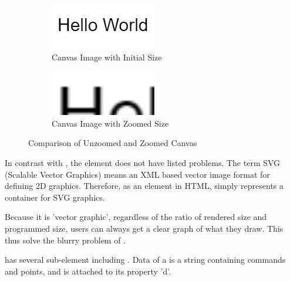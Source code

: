 \documentclass[12pt,twoside]{report}
\begin{document}
\begin{figure}[h!]
    \centering
    \begin{subfigure}[b]{0.4\linewidth}
        \centering
        \includegraphics[width=\linewidth, frame]{figures/unzoomed-canvas.png}
        \caption{Canvas Image with Initial Size}
    \end{subfigure}
    \begin{subfigure}[b]{0.4\linewidth}
        \centering
        \includegraphics[width=\linewidth, frame]{figures/zoomed-canvas.png}
        \caption{Canvas Image with Zoomed Size}
    \end{subfigure}
    \caption{Comparison of Unzoomed and Zoomed Canvas}
    \label{fig:canvas-zoom-comparison}
\end{figure}

In contrast with , the  element does not have listed
problems. The term SVG (Scalable Vector Graphics) means an XML based vector
image format for defining 2D graphics. Therefore, as an element in HTML,
 simply represents a container for SVG graphics.

Because it is 'vector graphic', regardless of the ratio of rendered size and
programmed size, users can always get a clear graph of what they draw. This thus
solve the blurry problem of .

 has several sub-element including . Data of a  is a string containing commands and points, and is attached to its property 'd'. 
\end{document}
